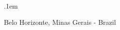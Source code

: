 \begin{center}
    
    \fontsize{40pt}{0pt}
    \openup .1em \\
    \fontsize{40pt}{0pt}
  \end{center}

  \normalsize{{\Large{}} Belo Horizonte, Minas Gerais - Brazil}